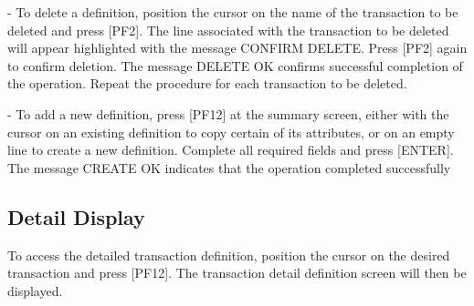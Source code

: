 \documentclass[letterpaper,10pt,english]{sphinxmanual}
\begin{document}
 - To delete a definition, position the cursor on the name of the transaction to be deleted and press {[}PF2{]}. The line associated with the transaction to be deleted will appear highlighted with the message CONFIRM DELETE. Press {[}PF2{]} again to confirm deletion. The message DELETE OK confirms successful completion of the operation. Repeat the procedure for each transaction to be deleted.

 - To add a new definition, press {[}PF12{]} at the summary screen, either with the cursor on an existing definition to copy certain of its attributes, or on an empty line to create a new definition. Complete all required fields and press {[}ENTER{]}. The message CREATE OK indicates that the operation completed successfully

\ignorespaces 

\subsection{Detail Display}
\label{\detokenize{connectivity_guide:index-114}}\label{\detokenize{connectivity_guide:id64}}
To access the detailed transaction definition, position the cursor on the desired transaction and press {[}PF12{]}. The transaction detail definition screen will then be displayed.



\ignorespaces 
\end{document}
